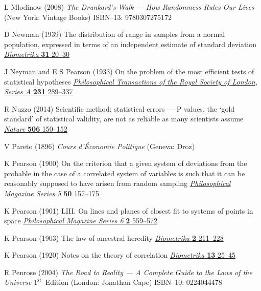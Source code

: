 \begin{thebibliography}{99}
L Mlodinow
(2008) \textit{The Drunkard's Walk --- How Randomness Rules Our 
Lives}
(New York: Vintage Books)
ISBN--13: 9780307275172

D Newman
(1939) The distribution of range in samples from a normal 
population, expressed in terms of an independent estimate of 
standard deviation
\href{http://dx.doi.org/10.1093/biomet/31.1-2.20}{\textit{Biometrika}
\textbf{31} 20--30}

J Neyman and E S Pearson
(1933) On the problem of the most efficient tests of statistical 
hypotheses
\href{http://dx.doi.org/10.1098/rsta.1933.0009}{\textit{Philosophical Transactions of the Royal Society of London, 
Series A} \textbf{231} 289--337}

R Nuzzo
(2014) Scientific method: statistical errors --- P values, the 
`gold standard' of statistical validity, are not as reliable as 
many scientists assume
\href{https://doi.org/10.1038/506150a}{\textit{Nature} \textbf{506} 
150--152}

V Pareto
(1896) \textit{Cours d'\'{E}conomie Politique} (Geneva: Droz)

K Pearson
(1900) On the criterion that a given system of deviations from the 
probable in the case of a correlated system of variables is such 
that it can be reasonably supposed to have arisen from random 
sampling
\href{http://dx.doi.org/10.1080/14786440009463897}{\textit{Philosophical Magazine Series 5} \textbf{50} 157--175}

K Pearson
(1901) LIII. On lines and planes of closest fit to systems of 
points in space
\href{http://dx.doi.org/10.1080/14786440109462720}{\textit{Philosophical Magazine Series 6} \textbf{2} 559--572}

K Pearson
(1903) The law of ancestral heredity
\href{https://doi.org/10.1093/biomet/2.2.211}{\textit{Biometrika} 
\textbf{2} 211--228}

K Pearson
(1920) Notes on the theory of correlation
\href{https://doi.org/10.1093/biomet/13.1.25}{\textit{Biometrika} 
\textbf{13} 25--45}

R Penrose
(2004) \textit{The Road to Reality --- A Complete Guide to the Laws
of the Universe}
$1^{\text{st}}$~Edition (London: Jonathan Cape)
ISBN--10: 0224044478


\end{thebibliography}
